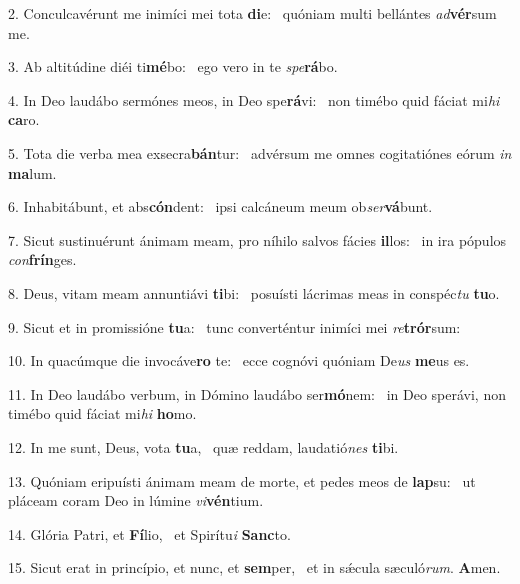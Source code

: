 2. Conculcavérunt me inimíci mei tota \textbf{di}e: \ast\  quóniam multi bellántes \textit{ad}\textbf{vér}sum me.\

3. Ab altitúdine diéi ti\textbf{mé}bo: \ast\  ego vero in te \textit{spe}\textbf{rá}bo.\

4. In Deo laudábo sermónes meos, in Deo spe\textbf{rá}vi: \ast\  non timébo quid fáciat mi\textit{hi} \textbf{ca}ro.\

5. Tota die verba mea exsecra\textbf{bán}tur: \ast\  advérsum me omnes cogitatiónes eórum \textit{in} \textbf{ma}lum.\

6. Inhabitábunt, et abs\textbf{cón}dent: \ast\  ipsi calcáneum meum ob\textit{ser}\textbf{vá}bunt.\

7. Sicut sustinuérunt ánimam meam, pro níhilo salvos fácies \textbf{il}los: \ast\  in ira pópulos \textit{con}\textbf{frín}ges.\

8. Deus, vitam meam annuntiávi \textbf{ti}bi: \ast\  posuísti lácrimas meas in conspéc\textit{tu} \textbf{tu}o.\

9. Sicut et in promissióne \textbf{tu}a: \ast\  tunc converténtur inimíci mei \textit{re}\textbf{trór}sum:\

10. In quacúmque die invocáve\textbf{ro} te: \ast\  ecce cognóvi quóniam De\textit{us} \textbf{me}us es.\

11. In Deo laudábo verbum, in Dómino laudábo ser\textbf{mó}nem: \ast\  in Deo sperávi, non timébo quid fáciat mi\textit{hi} \textbf{ho}mo.\

12. In me sunt, Deus, vota \textbf{tu}a, \ast\  quæ reddam, laudatió\textit{nes} \textbf{ti}bi.\

13. Quóniam eripuísti ánimam meam de morte, et pedes meos de \textbf{lap}su: \ast\  ut pláceam coram Deo in lúmine \textit{vi}\textbf{vén}tium.\

14. Glória Patri, et \textbf{Fí}lio, \ast\  et Spirítu\textit{i} \textbf{Sanc}to.\

15. Sicut erat in princípio, et nunc, et \textbf{sem}per, \ast\  et in sǽcula sæculó\textit{rum}. \textbf{A}men.\

